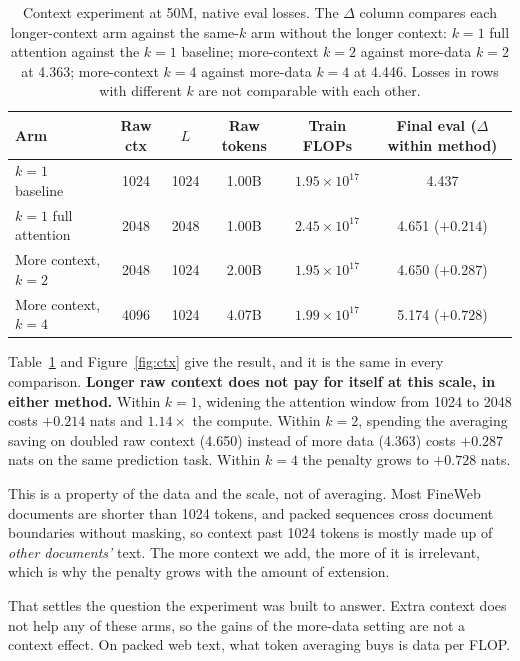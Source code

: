 \documentclass[11pt]{article}
\newcommand{\good}[1]{\textcolor{okgreen}{#1}}
\newcommand{\bad}[1]{\textcolor{warnred}{#1}}
\newcommand{\Ltr}{L}            %
\begin{document}
\begin{table}[h]
\centering
\caption{Context experiment at 50M, native eval losses. The $\Delta$ column
compares each longer-context arm against the same-$k$ arm without the longer
context: $k{=}1$ full attention against the $k{=}1$ baseline; more-context
$k{=}2$ against more-data $k{=}2$ at 4.363; more-context $k{=}4$ against
more-data $k{=}4$ at 4.446. Losses in rows with different $k$ are not
comparable with each other.}
\label{tab:ctx}
\vspace{0.4em}
\small
\begin{tabular}{lccccc}
\toprule
Arm & Raw ctx & $\Ltr$ & Raw tokens & Train FLOPs & Final eval ($\Delta$ within method) \\
\midrule
$k{=}1$ baseline & 1024 & 1024 & 1.00B & $1.95\times10^{17}$ & \good{4.437} \\
$k{=}1$ full attention & 2048 & 2048 & 1.00B & $2.45\times10^{17}$ & 4.651 \;(\bad{$+0.214$}) \\
More context, $k{=}2$ & 2048 & 1024 & 2.00B & $1.95\times10^{17}$ & 4.650 \;(\bad{$+0.287$}) \\
More context, $k{=}4$ & 4096 & 1024 & 4.07B & $1.99\times10^{17}$ & 5.174 \;(\bad{$+0.728$}) \\
\bottomrule
\end{tabular}
\end{table}

Table~\ref{tab:ctx} and Figure~\ref{fig:ctx} give the result, and it is the
same in every comparison. \textbf{Longer raw context does not pay for itself at
this scale, in either method.} Within $k{=}1$, widening the attention window
from 1024 to 2048 costs $+0.214$ nats and $1.14\times$ the compute. Within
$k{=}2$, spending the averaging saving on doubled raw context (4.650) instead
of more data (4.363) costs $+0.287$ nats on the same prediction task. Within
$k{=}4$ the penalty grows to $+0.728$ nats.

This is a property of the data and the scale, not of averaging. Most FineWeb
documents are shorter than 1024 tokens, and packed sequences cross document
boundaries without masking, so context past 1024 tokens is mostly made up of
\emph{other documents'} text. The more context we add, the more of it is
irrelevant, which is why the penalty grows with the amount of extension.

That settles the question the experiment was built to answer. Extra context
does not help any of these arms, so the gains of the more-data setting are not
a context effect. On packed web text, what token averaging buys is data per
FLOP.
\end{document}
